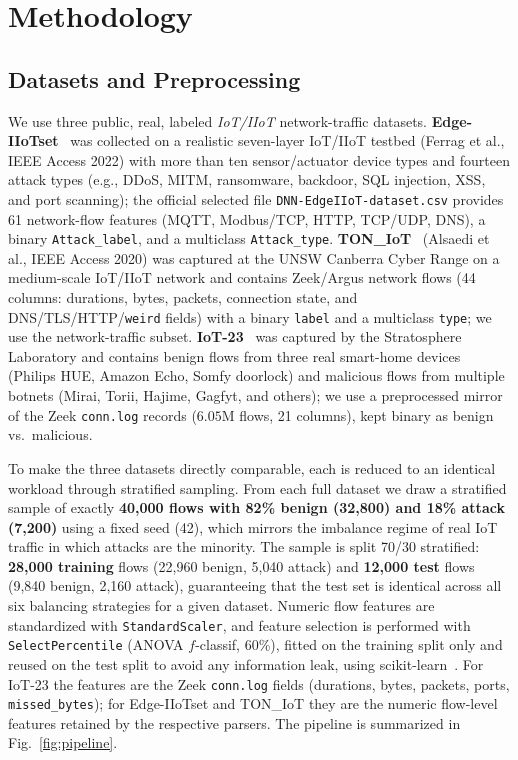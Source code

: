 ﻿\documentclass[journal]{IEEEtran}
\begin{document}
\section{Methodology}
\label{sec:method}

\subsection{Datasets and Preprocessing}
We use three public, real, labeled \emph{IoT/IIoT} network-traffic datasets. \textbf{Edge-IIoTset}~\cite{ferrag2022edgeiiotset} was collected on a realistic seven-layer IoT/IIoT testbed (Ferrag et al., IEEE Access 2022) with more than ten sensor/actuator device types and fourteen attack types (e.g., DDoS, MITM, ransomware, backdoor, SQL injection, XSS, and port scanning); the official selected file \texttt{DNN-EdgeIIoT-dataset.csv} provides 61 network-flow features (MQTT, Modbus/TCP, HTTP, TCP/UDP, DNS), a binary \texttt{Attack\_label}, and a multiclass \texttt{Attack\_type}. \textbf{TON\_IoT}~\cite{alsaedi2020toniot} (Alsaedi et al., IEEE Access 2020) was captured at the UNSW Canberra Cyber Range on a medium-scale IoT/IIoT network and contains Zeek/Argus network flows (44 columns: durations, bytes, packets, connection state, and DNS/TLS/HTTP/\texttt{weird} fields) with a binary \texttt{label} and a multiclass \texttt{type}; we use the network-traffic subset. \textbf{IoT-23}~\cite{garcia2020iot23} was captured by the Stratosphere Laboratory and contains benign flows from three real smart-home devices (Philips HUE, Amazon Echo, Somfy doorlock) and malicious flows from multiple botnets (Mirai, Torii, Hajime, Gagfyt, and others); we use a preprocessed mirror of the Zeek \texttt{conn.log} records ($6.05$M flows, 21 columns), kept binary as benign vs.\ malicious.

To make the three datasets directly comparable, each is reduced to an identical workload through stratified sampling. From each full dataset we draw a stratified sample of exactly \textbf{40{,}000 flows with 82\% benign (32{,}800) and 18\% attack (7{,}200)} using a fixed seed (42), which mirrors the imbalance regime of real IoT traffic in which attacks are the minority. The sample is split 70/30 stratified: \textbf{28{,}000 training} flows (22{,}960 benign, 5{,}040 attack) and \textbf{12{,}000 test} flows (9{,}840 benign, 2{,}160 attack), guaranteeing that the test set is identical across all six balancing strategies for a given dataset. Numeric flow features are standardized with \texttt{StandardScaler}, and feature selection is performed with \texttt{SelectPercentile} (ANOVA $f$-classif, 60\%), fitted on the training split only and reused on the test split to avoid any information leak, using scikit-learn~\cite{pedregosa2011sklearn}. For IoT-23 the features are the Zeek \texttt{conn.log} fields (durations, bytes, packets, ports, \texttt{missed\_bytes}); for Edge-IIoTset and TON\_IoT they are the numeric flow-level features retained by the respective parsers. The pipeline is summarized in Fig.~\ref{fig:pipeline}.
\end{document}
